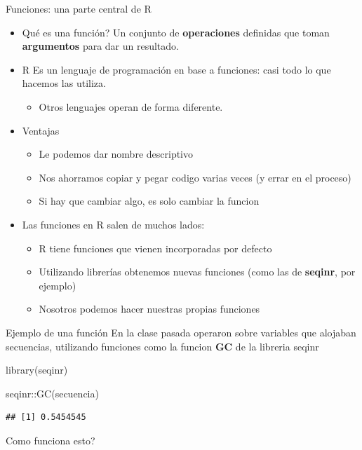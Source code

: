 \documentclass[
  10pt,
  ignorenonframetext,
]{beamer}
\newenvironment{Shaded}{\begin{snugshade}}{\end{snugshade}}
\newcommand{\FunctionTok}[1]{\textcolor[rgb]{0.00,0.00,0.00}{#1}}
\newcommand{\NormalTok}[1]{#1}
\newcommand{\SpecialCharTok}[1]{\textcolor[rgb]{0.00,0.00,0.00}{#1}}
\providecommand{\tightlist}{%
  \setlength{\itemsep}{0pt}\setlength{\parskip}{0pt}}
\begin{document}
\begin{frame}{Funciones: una parte central de R}
\protect\hypertarget{funciones-una-parte-central-de-r}{}
\begin{itemize}
\item
  Qué es una función? Un conjunto de \textbf{operaciones} definidas que
  toman \textbf{argumentos} para dar un resultado.
\item
  R Es un lenguaje de programación en base a funciones: casi todo lo que
  hacemos las utiliza.

  \begin{itemize}
  \tightlist
  \item
    Otros lenguajes operan de forma diferente.
  \end{itemize}
\item
  Ventajas

  \begin{itemize}
  \tightlist
  \item
    Le podemos dar nombre descriptivo
  \item
    Nos ahorramos copiar y pegar codigo varias veces (y errar en el
    proceso)
  \item
    Si hay que cambiar algo, es solo cambiar la funcion
  \end{itemize}
\item
  Las funciones en R salen de muchos lados:

  \begin{itemize}
  \tightlist
  \item
    R tiene funciones que vienen incorporadas por defecto
  \item
    Utilizando librerías obtenemos nuevas funciones (como las de
    \textbf{seqinr}, por ejemplo)
  \item
    Nosotros podemos hacer nuestras propias funciones
  \end{itemize}
\end{itemize}
\end{frame}

\begin{frame}[fragile]{Ejemplo de una función}
\protect\hypertarget{ejemplo-de-una-funciuxf3n}{}
En la clase pasada operaron sobre variables que alojaban secuencias,
utilizando funciones como la funcion \textbf{GC} de la libreria seqinr
\vspace{15pt}

\begin{Shaded}
\begin{Highlighting}[]
\FunctionTok{library}\NormalTok{(seqinr)}

\NormalTok{seqinr}\SpecialCharTok{::}\FunctionTok{GC}\NormalTok{(secuencia)}
\end{Highlighting}
\end{Shaded}

\begin{verbatim}
## [1] 0.5454545
\end{verbatim}

\vspace{15pt}

Como funciona esto?
\end{frame}
\end{document}
